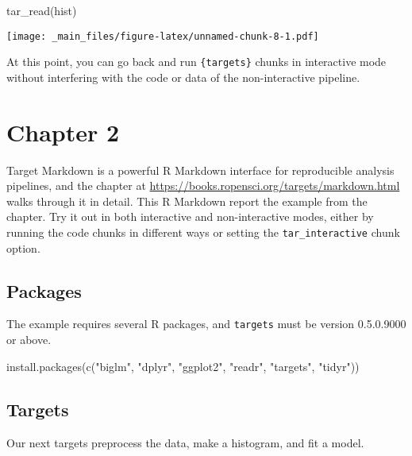 \documentclass[
]{book}
\newenvironment{Shaded}{\begin{snugshade}}{\end{snugshade}}
\newcommand{\FunctionTok}[1]{\textcolor[rgb]{0.00,0.00,0.00}{#1}}
\newcommand{\NormalTok}[1]{#1}
\newcommand{\StringTok}[1]{\textcolor[rgb]{0.31,0.60,0.02}{#1}}
\begin{document}
\begin{Shaded}
\begin{Highlighting}[]
\FunctionTok{tar\_read}\NormalTok{(hist)}
\end{Highlighting}
\end{Shaded}

\texttt{[image: \_main\_files/figure-latex/unnamed-chunk-8-1.pdf]}

At this point, you can go back and run \texttt{\{targets\}} chunks in interactive mode without interfering with the code or data of the non-interactive pipeline.

\hypertarget{chapter-2}{%
\chapter{Chapter 2}\label{chapter-2}}

Target Markdown is a powerful R Markdown interface for reproducible analysis pipelines, and the chapter at \url{https://books.ropensci.org/targets/markdown.html} walks through it in detail. This R Markdown report the example from the chapter. Try it out in both interactive and non-interactive modes, either by running the code chunks in different ways or setting the \texttt{tar\_interactive} chunk option.

\hypertarget{packages-1}{%
\section{Packages}\label{packages-1}}

The example requires several R packages, and \texttt{targets} must be version 0.5.0.9000 or above.

\begin{Shaded}
\begin{Highlighting}[]
\FunctionTok{install.packages}\NormalTok{(}\FunctionTok{c}\NormalTok{(}\StringTok{"biglm"}\NormalTok{, }\StringTok{"dplyr"}\NormalTok{, }\StringTok{"ggplot2"}\NormalTok{, }\StringTok{"readr"}\NormalTok{, }\StringTok{"targets"}\NormalTok{, }\StringTok{"tidyr"}\NormalTok{))}
\end{Highlighting}
\end{Shaded}

\hypertarget{targets-1}{%
\section{Targets}\label{targets-1}}

Our next targets preprocess the data, make a histogram, and fit a model.
\end{document}
